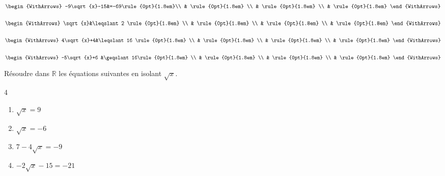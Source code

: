 \documentclass[main.tex]{subfiles}
\begin{document}
 
\begin{example}\hfill  \vspace{-0.5em}
	
	\noindent\hfill\parbox{0.23\linewidth}{	
			$\begin{WithArrows}
					-9\sqrt{x}-15&=-69\rule{0pt}{1.8em}\\
					&  \rule{0pt}{1.8em} \\
					&  \rule{0pt}{1.8em} \\
					&  \rule{0pt}{1.8em}    
				\end{WithArrows}$ 	
		}  \hfill\parbox{0.23\linewidth}{	
			$\begin{WithArrows}
					\sqrt{x}&\leqslant 2 \rule{0pt}{1.8em} \\ %
					&  \rule{0pt}{1.8em}  \\  
					&   \rule{0pt}{1.8em}  \\
					&  \rule{0pt}{1.8em}   
				\end{WithArrows}$ 	
		} \hfill\parbox{0.23\linewidth}{	
			$\begin{WithArrows}
					4\sqrt{x}+4&\leqslant 16 \rule{0pt}{1.8em} \\ %
					&  \rule{0pt}{1.8em}  \\  
					&   \rule{0pt}{1.8em}  \\
					&  \rule{0pt}{1.8em}   
				\end{WithArrows}$ 	
		} \hfill\parbox{0.23\linewidth}{	
			$\begin{WithArrows}
					-5\sqrt{x}+6  &\geqslant 16\rule{0pt}{1.8em} \\ %
					&  \rule{0pt}{1.8em}  \\  
					&   \rule{0pt}{1.8em}  \\
					&  \rule{0pt}{1.8em}   
				\end{WithArrows}$ 	
		}
\end{example}
\begin{exercise}\label{chapter09:exercice:racine:equations} Résoudre dans $\mathbb{R}$ les équations suivantes en isolant $\sqrt{x}$.
	\vspace{-0.5em}
	\begin{multicols}{4}
			\begin{enumerate}[label={$(E_\arabic*)$}, leftmargin=*]
					\item $\sqrt{x}=9$ 
					\item $\sqrt{x}=-6$  
					\item $7-4\sqrt{x}=-9$  
					\item $-2\sqrt{x}-15=-21$ 
				\end{enumerate}
		\end{multicols}
\end{exercise} \vspace{-0.5em}
\end{document}
